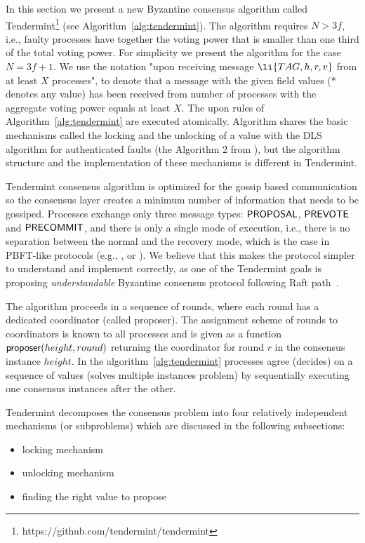 In this section we present a new Byzantine consensus algorithm called Tendermint\footnote{https://github.com/tendermint/tendermint} 
(see Algorithm~\ref{alg:tendermint}). 
The algorithm requires $N > 3f$, i.e., faulty processes have together the voting power that is smaller than one third of the total voting power. For simplicity we present the algorithm for the case $N = 3f + 1$. We use the notation "upon receiving message $\li{TAG, h, r, v}$ from at least $X$ processes", to denote that a message with the given field values (* denotes any value) has been received from number of processes with the aggregate voting power equals at least $X$. 
The upon rules of Algorithm~\ref{alg:tendermint} are executed atomically. 
Algorithm shares the basic mechanisms called the locking and the unlocking of a value with the DLS algorithm for authenticated faults (the Algorithm 2 from \cite{DLS88:jacm}), but the algorithm structure and the implementation of these mechanisms is different in Tendermint. 

Tendermint consensus algorithm is optimized for the gossip based communication so the consensus layer creates a minimum number of information that needs to be gossiped. Processes exchange only three message types: $\mathsf{PROPOSAL}$, $\mathsf{PREVOTE}$ and $\mathsf{PRECOMMIT}$, and there is only a single mode of execution, i.e., there is no separation between the normal and the recovery mode, which is the case in PBFT-like protocols (e.g., \cite{CL02:tcs}, \cite{Ver09:spinning} or \cite{Cle09:aardvark}). We believe that this makes the protocol simpler to understand and implement correctly, as one of the Tendermint goals is proposing \emph{understandable} Byzantine consensus protocol following Raft path~\cite{Ongaro14:raft}.  

The algorithm proceeds in a sequence of rounds, where each round has a dedicated coordinator (called proposer). The assignment scheme of rounds to coordinators is known to all processes and is given as a function $\mathsf{proposer}(height, round)$ returning the coordinator for round $r$ in the consensus instance $height$. In the algorithm~\ref{alg:tendermint} processes agree (decides) on a sequence of values (solves multiple instances problem) by sequentially executing one consensus instances after the other.
 
 Tendermint decomposes the consensus problem into four relatively independent mechanisms (or subproblems) which are discussed in the following subsections:
\begin{itemize}
	\item locking mechanism 
	\item unlocking mechanism
	\item finding the right value to propose
\end{itemize}

